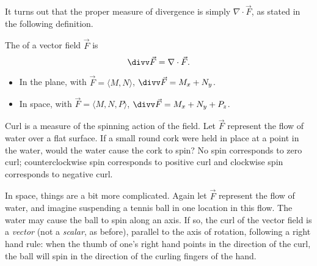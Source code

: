 It turns out that the proper measure of divergence is simply $\nabla \cdot \vec F$, as stated in the following definition.

{The  of a vector field $\vec F$ is
$$\divv \vec F = \nabla \cdot \vec F.$$
\begin{itemize}
	\item In the plane, with $\vec F = \langle M,N\rangle$, $\divv \vec F = M_x+N_y$.
	\item	In space, with $\vec F = \langle M,N,P\rangle$, $\divv \vec F = M_x+N_y+P_z$.
\end{itemize}
}


Curl is a measure of the spinning action of the field. Let $\vec F$ represent the flow of water over a flat surface. If a small round cork were held in place at a point in the water, would the water cause the cork to spin? No spin corresponds to zero curl; counterclockwise spin corresponds to positive curl and clockwise spin corresponds to negative curl. 

In space, things are a bit more complicated. Again let $\vec F$ represent the flow of water, and imagine suspending a tennis ball in one location in this flow. The water may cause the ball to spin along an axis. If so, the curl of the vector field is a \emph{vector} (not a \emph{scalar}, as before), parallel to the axis of rotation, following a right hand rule: when the thumb of one's right hand points in the direction of the curl, the ball will spin in the direction of the curling fingers of the hand.

